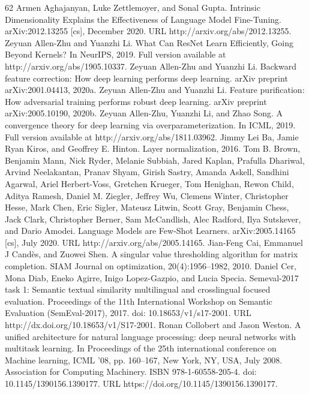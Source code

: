 \documentclass[conference]{IEEEtran}
\begin{document}
\begin{thebibliography}{62}
 Armen Aghajanyan, Luke Zettlemoyer, and Sonal Gupta. Intrinsic Dimensionality Explains the Effectiveness of Language Model Fine-Tuning. arXiv:2012.13255 [cs], December 2020. URL http://arxiv.org/abs/2012.13255.
 Zeyuan Allen-Zhu and Yuanzhi Li. What Can ResNet Learn Efficiently, Going Beyond Kernels? In NeurIPS, 2019. Full version available at http://arxiv.org/abs/1905.10337.
 Zeyuan Allen-Zhu and Yuanzhi Li. Backward feature correction: How deep learning performs deep learning. arXiv preprint arXiv:2001.04413, 2020a.
 Zeyuan Allen-Zhu and Yuanzhi Li. Feature purification: How adversarial training performs robust deep learning. arXiv preprint arXiv:2005.10190, 2020b.
 Zeyuan Allen-Zhu, Yuanzhi Li, and Zhao Song. A convergence theory for deep learning via overparameterization. In ICML, 2019. Full version available at http://arxiv.org/abs/1811.03962.
 Jimmy Lei Ba, Jamie Ryan Kiros, and Geoffrey E. Hinton. Layer normalization, 2016.
 Tom B. Brown, Benjamin Mann, Nick Ryder, Melanie Subbiah, Jared Kaplan, Prafulla Dhariwal, Arvind Neelakantan, Pranav Shyam, Girish Sastry, Amanda Askell, Sandhini Agarwal, Ariel Herbert-Voss, Gretchen Krueger, Tom Henighan, Rewon Child, Aditya Ramesh, Daniel M. Ziegler, Jeffrey Wu, Clemens Winter, Christopher Hesse, Mark Chen, Eric Sigler, Mateusz Litwin, Scott Gray, Benjamin Chess, Jack Clark, Christopher Berner, Sam McCandlish, Alec Radford, Ilya Sutskever, and Dario Amodei. Language Models are Few-Shot Learners. arXiv:2005.14165 [cs], July 2020. URL http://arxiv.org/abs/2005.14165.
 Jian-Feng Cai, Emmanuel J Candès, and Zuowei Shen. A singular value thresholding algorithm for matrix completion. SIAM Journal on optimization, 20(4):1956–1982, 2010.
 Daniel Cer, Mona Diab, Eneko Agirre, Inigo Lopez-Gazpio, and Lucia Specia. Semeval-2017 task 1: Semantic textual similarity multilingual and crosslingual focused evaluation. Proceedings of the 11th International Workshop on Semantic Evaluation (SemEval-2017), 2017. doi: 10.18653/v1/s17-2001. URL http://dx.doi.org/10.18653/v1/S17-2001.
 Ronan Collobert and Jason Weston. A unified architecture for natural language processing: deep neural networks with multitask learning. In Proceedings of the 25th international conference on Machine learning, ICML '08, pp. 160–167, New York, NY, USA, July 2008. Association for Computing Machinery. ISBN 978-1-60558-205-4. doi: 10.1145/1390156.1390177. URL https://doi.org/10.1145/1390156.1390177.

\end{thebibliography}
\end{document}
